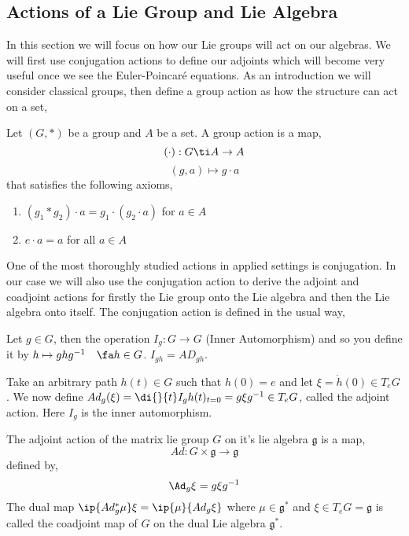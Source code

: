 
\subsection{Actions of a Lie Group and Lie Algebra}
In this section we will focus on how our Lie groups will act on our algebras. We will first use conjugation actions to define our adjoints which will become very useful once we see the Euler-Poincar\'e equations. As an introduction we will consider classical groups, then define a group action as how the structure can act on a set,
\begin{ndefi}
  Let $(G, *)$ be a group and $A$ be a set. A group action is a map,
  $$ (\cdot) : G \ti A \to A $$
  $$ (g, a) \mapsto g \cdot a $$
  that satisfies the following axioms,
  \begin{enumerate}[(\bfseries{A}1)]
    \item $(g_1 * g_2) \cdot a = g_1 \cdot (g_2 \cdot a)$ for $a \in A$
    \item $e \cdot a = a$ for all $a \in A$
  \end{enumerate}
\end{ndefi}

\noindent
One of the most thoroughly studied actions in applied settings is conjugation. In our case we will also use the conjugation action to derive the adjoint and coadjoint actions for firstly the Lie group onto the Lie algebra and then the Lie algebra onto itself. The conjugation action is defined in the usual way,

\begin{ndefi}
  Let $g \in G$, then the operation $I_g : G \to G$ (Inner Automorphism) and so you define it by $h \mapsto ghg^{-1}\quad\fa h \in G$. $I_{gh} = AD_{gh}$.
\end{ndefi}

\noindent
Take an arbitrary path $h(t) \in {G}$ such that $h(0) = e$ and let $\xi = \dot h(0) \in T_eG$. We now define $Ad_g(\xi) = \di {}{t} I_g h(t)_{t=0} = g \xi g^{-1} \in T_eG$, called the adjoint action. Here $I_g$ is the inner automorphism.

\begin{ndefi}
  The adjoint action of the matrix lie group $G$ on it's lie algebra $\mathfrak{g}$ is a map,
  $$ Ad : G \times \mathfrak{g} \to \mathfrak{g} $$
  defined by,
  $$ \Ad_g \xi = g\xi g^{-1} $$
  The dual map $\ip {Ad^*_g \mu} \xi = \ip {\mu} {Ad_g\xi}$ where $\mu \in \mathfrak{g}^*$ and $\xi \in T_eG = \mathfrak{g}$ is called the coadjoint map of $G$ on the dual Lie algebra $\mathfrak{g}^*$.
\end{ndefi}

